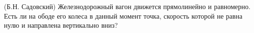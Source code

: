 (Б.Н. Садовский)
Железнодорожный вагон движется прямолинейно и равномерно. Есть ли
на ободе его колеса в данный момент точка, скорость которой не равна
нулю и направлена вертикально вниз?
